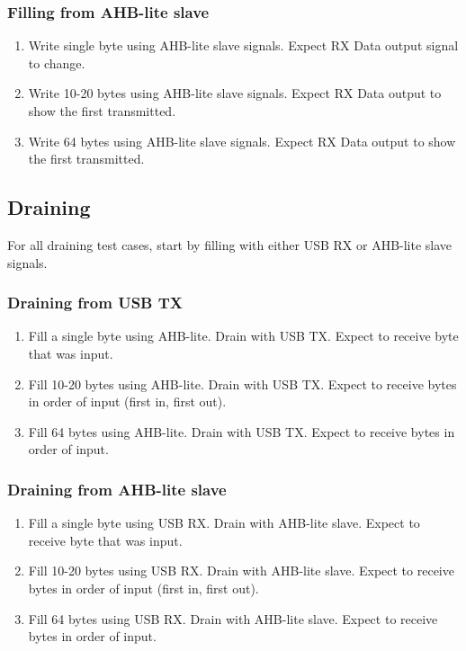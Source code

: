 \documentclass{scrartcl}
\begin{document}
\subsubsection{Filling from AHB-lite slave}
\begin{enumerate}
    \item Write single byte using AHB-lite slave signals. Expect RX Data output signal to change.
    \item Write 10-20 bytes using AHB-lite slave signals. Expect RX Data output to show the first transmitted.
    \item Write 64 bytes using AHB-lite slave signals. Expect RX Data output to show the first transmitted.
\end{enumerate}

\subsection{Draining}
For all draining test cases, start by filling with either USB RX or AHB-lite slave signals.

\subsubsection{Draining from USB TX}
\begin{enumerate}
    \item Fill a single byte using AHB-lite. Drain with USB TX. Expect to receive byte that was input.
    \item Fill 10-20 bytes using AHB-lite. Drain with USB TX. Expect to receive bytes in order of input (first in, first out).
    \item Fill 64 bytes using AHB-lite. Drain with USB TX. Expect to receive bytes in order of input.
\end{enumerate}

\subsubsection{Draining from AHB-lite slave}
\begin{enumerate}
    \item Fill a single byte using USB RX. Drain with AHB-lite slave. Expect to receive byte that was input.
    \item Fill 10-20 bytes using USB RX. Drain with AHB-lite slave. Expect to receive bytes in order of input (first in, first out).
    \item Fill 64 bytes using USB RX. Drain with AHB-lite slave. Expect to receive bytes in order of input.
\end{enumerate}
\end{document}
